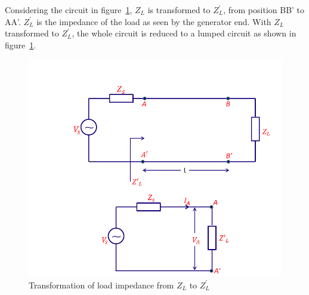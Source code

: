 Considering the circuit in figure~\ref{fig:qwerrtt}, $Z_L$ is transformed to $Z^{'}_L$, from position BB' to AA'. $Z^{'}_L$ is the impedance of the load as seen by the generator end. With $Z_L$ transformed to $Z^{'}_L$, the whole circuit is reduced to a lumped circuit as shown in figure~\ref{fig:qwerrtt}.
\begin{figure}[h]
\centering
\includegraphics[width=1.1\linewidth]{./graphics/load_transformation}
\caption{Transformation of load impedance from $Z_L$ to $Z_{L}^'$}
\label{fig:qwerrtt}
\end{figure}

